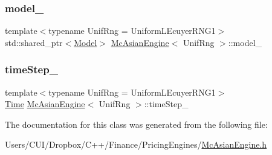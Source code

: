 \subsubsection{\texorpdfstring{model\+\_\+}{model\_}}
{\footnotesize\ttfamily template$<$typename Unif\+Rng  = Uniform\+L\+Ecuyer\+R\+N\+G1$>$ \\
std\+::shared\+\_\+ptr$<$\hyperlink{class_model}{Model}$>$ \hyperlink{class_mc_asian_engine}{Mc\+Asian\+Engine}$<$ Unif\+Rng $>$\+::model\+\_\+\hspace{0.3cm}{\ttfamily [private]}}

\hypertarget{class_mc_asian_engine_a44bf438e294ec6b6475e85412422ec54}{}\label{class_mc_asian_engine_a44bf438e294ec6b6475e85412422ec54} 
\subsubsection{\texorpdfstring{time\+Step\+\_\+}{timeStep\_}}
{\footnotesize\ttfamily template$<$typename Unif\+Rng  = Uniform\+L\+Ecuyer\+R\+N\+G1$>$ \\
\hyperlink{_name_def_8h_ac2d3e0ba793497bcca555c7c2cf64ff3}{Time} \hyperlink{class_mc_asian_engine}{Mc\+Asian\+Engine}$<$ Unif\+Rng $>$\+::time\+Step\+\_\+\hspace{0.3cm}{\ttfamily [private]}}



The documentation for this class was generated from the following file\+:\begin{DoxyCompactItemize}
\item 
Users/\+C\+U\+I/\+Dropbox/\+C++/\+Finance/\+Pricing\+Engines/\hyperlink{_mc_asian_engine_8h}{Mc\+Asian\+Engine.\+h}\end{DoxyCompactItemize}
